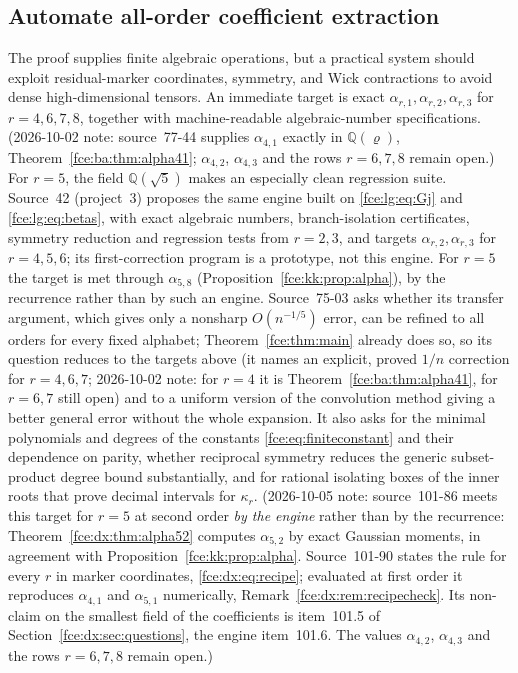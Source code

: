 \documentclass[11pt,a4paper]{article}
\numberwithin{equation}{section}
\theoremstyle{definition}\newtheorem{definition}[theorem]{Definition}
\theoremstyle{remark}\newtheorem{remark}[theorem]{Remark}
\newcommand{\Q}{\mathbb Q}
\begin{document}
\subsection{Automate all-order coefficient extraction}
The proof supplies finite algebraic operations, but a practical system
should exploit residual-marker coordinates, symmetry, and Wick
contractions to avoid dense high-dimensional tensors. An immediate target
is exact $\alpha_{r,1},\alpha_{r,2},\alpha_{r,3}$ for $r=4,6,7,8$, together
with machine-readable algebraic-number specifications. (2026-10-02 note:
source~77-44 supplies $\alpha_{4,1}$ exactly in $\Q(\varrho)$,
Theorem~\ref{fce:ba:thm:alpha41}; $\alpha_{4,2}$, $\alpha_{4,3}$ and the rows
$r=6,7,8$ remain open.) For $r=5$, the
field $\Q(\sqrt5)$ makes an especially clean regression suite.
Source~42 (project~3) proposes the same engine built on
\eqref{fce:lg:eq:Gj} and \eqref{fce:lg:eq:betas}, with exact algebraic
numbers, branch-isolation certificates, symmetry reduction and regression
tests from $r=2,3$, and targets $\alpha_{r,2},\alpha_{r,3}$ for $r=4,5,6$;
its first-correction program is a prototype, not this engine. For $r=5$
the target is met through $\alpha_{5,8}$ (Proposition~\ref{fce:kk:prop:alpha}),
by the recurrence rather than by such an engine. Source~75-03 asks whether
its transfer argument, which gives only a nonsharp $O(n^{-1/5})$ error, can
be refined to all orders for every fixed alphabet; Theorem~\ref{fce:thm:main}
already does so, so its question reduces to the targets above (it names an
explicit, proved $1/n$ correction for $r=4,6,7$; 2026-10-02 note: for
$r=4$ it is Theorem~\ref{fce:ba:thm:alpha41}, for $r=6,7$ still open) and to a uniform version of
the convolution method giving a better general error without the whole
expansion. It also asks for the minimal polynomials and degrees of the
constants \eqref{fce:eq:finiteconstant} and their dependence on parity,
whether reciprocal symmetry reduces the generic subset-product degree
bound substantially, and for rational isolating boxes of the inner roots
that prove decimal intervals for $\kappa_r$. (2026-10-05 note: source~101-86
meets this target for $r=5$ at second order \emph{by the engine} rather than
by the recurrence: Theorem~\ref{fce:dx:thm:alpha52} computes $\alpha_{5,2}$
by exact Gaussian moments, in agreement with
Proposition~\ref{fce:kk:prop:alpha}. Source~101-90 states the rule for every
$r$ in marker coordinates, \eqref{fce:dx:eq:recipe}; evaluated at first order
it reproduces $\alpha_{4,1}$ and $\alpha_{5,1}$ numerically,
Remark~\ref{fce:dx:rem:recipecheck}. Its non-claim on the smallest field of
the coefficients is item~101.5 of Section~\ref{fce:dx:sec:questions}, the
engine item~101.6. The values $\alpha_{4,2}$, $\alpha_{4,3}$ and the rows
$r=6,7,8$ remain open.)
\end{document}
